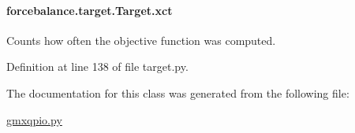 \hypertarget{classforcebalance_1_1target_1_1Target_aad2e385cfbf7b4a68f1c2cb41133fe82}{
\paragraph[{xct}]{\setlength{\rightskip}{0pt plus 5cm}forcebalance.\-target.\-Target.\-xct\hspace{0.3cm}{\ttfamily [inherited]}}}\label{classforcebalance_1_1target_1_1Target_aad2e385cfbf7b4a68f1c2cb41133fe82}


Counts how often the objective function was computed. 



Definition at line 138 of file target.\-py.



The documentation for this class was generated from the following file\-:\begin{DoxyCompactItemize}
\item 
\hyperlink{gmxqpio_8py}{gmxqpio.\-py}\end{DoxyCompactItemize}
